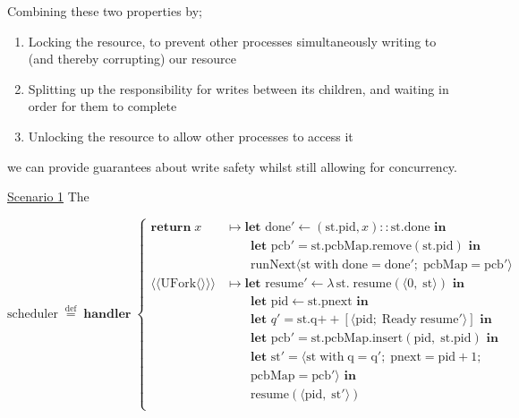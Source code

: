 \documentclass[logo,bsc,singlespacing,parskip]{infthesis}
\begin{document}
Combining these two properties by;
\begin{enumerate}
    \item Locking the resource, to prevent other processes simultaneously writing to (and thereby corrupting) our resource
    \item Splitting up the responsibility for writes between its children, and waiting in order for them to complete
    \item Unlocking the resource to allow other processes to access it
\end{enumerate}

we can provide guarantees about write safety whilst still allowing for concurrency.
 

\underline{Scenario 1} 
The 

\[
\mathrm{scheduler} \;\overset{\mathrm{def}}{=}\;
\textbf{handler} \;\left\{
\begin{array}{ll}
  \mathbf{return}\; x 
    & \mapsto \textbf{let } \mathrm{done'} \leftarrow (\mathrm{st.pid}, x) :: \mathrm{st.done} \textbf{ in} \\
    & \quad\quad \textbf{let } \mathrm{pcb'} = \mathrm{st.pcbMap.remove}(\mathrm{st.pid}) \textbf{ in} \\
    & \quad\quad \mathrm{runNext} \langle \mathrm{st\; with\; done = done';\; pcbMap = pcb'} \rangle
    
    \\[1ex]

  \langle\!\langle \mathrm{UFork} \langle\rangle \rangle\!\rangle 
    & \mapsto \textbf{let } \mathrm{resume'} \leftarrow \lambda\, \mathrm{st}.\; \mathrm{resume}(\langle 0,\; \mathrm{st} \rangle) \textbf{ in} \\
    & \quad\quad \textbf{let } \mathrm{pid} \leftarrow \mathrm{st.pnext} \textbf{ in} \\
    & \quad\quad \textbf{let } q' = \mathrm{st.q} \mathbin{++} [\langle \mathrm{pid};\; \mathrm{Ready}\; \mathrm{resume'} \rangle] \textbf{ in} \\
    & \quad\quad \textbf{let } \mathrm{pcb'} = \mathrm{st.pcbMap.insert}(\mathrm{pid},\; \mathrm{st.pid}) \textbf{ in} \\
    & \quad\quad \textbf{let } \mathrm{st'} = \langle \mathrm{st\; with\; q = q';\; pnext = pid} + 1;\; \\ 
    & \quad\quad\mathrm{pcbMap = pcb'} \rangle \textbf{ in} \\
    & \quad\quad \mathrm{resume}(\langle \mathrm{pid},\; \mathrm{st'} \rangle) \\[1ex]


\end{array}\]
\end{document}
